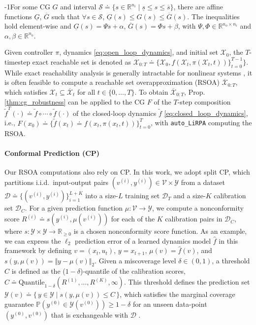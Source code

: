 \documentclass{l4dc2026}
\begin{document}
\begin{proposition}
\label{thm:cg_robustness}
\looseness-1For some CG $G$ and interval $\mathcal{S} \doteq \{s \in \mathbb{R}^{n_i} \mid \underline{s} \le s \le \overline{s}\}$, there are affine functions $\underline{G}$, $\overline{G}$ such that $\forall s \in \mathcal{S}$, $\underline{G}(s) \leq G(s) \leq \overline{G}(s)$. 
The inequalities hold element-wise and $\underline{G}(s) = \Psi s + \alpha$,  $\overline{G}(s) = \Phi s + \beta$, with $\Psi, \Phi \in \mathbb{R}^{n_o \times n_i}$ and $\alpha, \beta \in \mathbb{R}^{n_o}$.
\end{proposition}

\noindent Given controller $\pi$, dynamics \eqref{eq:open_loop_dynamics}, and initial set $\mathcal{X}_0$, the $T$-timestep exact reachable set is denoted as $\mathcal{X}_{0:T} \doteq \{\mathcal{X}_0, f(\mathcal{X}_t, \pi(\mathcal{X}_t,t)) \}_{t=0}^{T-1}\}$. While exact reachability analysis is generally intractable for nonlinear systems \citep{DBLP:journals/arcras/AlthoffFG21}, it is often feasible to compute a reachable set overapproximation (RSOA) $\overline{\mathcal{X}}_{0:T}$, which satisfies $\mathcal{X}_t \subseteq \overline{\mathcal{X}}_t$ for all $t \in \{0,\ldots,T\}$. To obtain $\overline{\mathcal{X}}_{0:T}$, Prop. \ref{thm:cg_robustness} can be applied to the CG $F$ of the $T$-step composition ${\tilde f^{T}}(\cdot) \doteq \tilde{f} \circ \dotsb \circ \tilde{f}(\cdot)$ of the closed-loop dynamics $\tilde f$ \eqref{eq:closed_loop_dynamics}, i.e., $F(x_0) \doteq \{\tilde f(x_t) \doteq f(x_t, \pi(x_t, t)) \}_{t=0}^{T}$, with \texttt{auto\_LiRPA} computing the RSOA.

\paragraph{Conformal Prediction (CP)}
Our RSOA computations also rely on CP. In this work, we adopt split CP, which partitions i.i.d.\ input-output pairs $(v^{(i)}, y^{(i)}) \in \mathcal{V}\times\mathcal{Y}$ from a dataset $\mathcal{D} \doteq\{(v^{(i)}, y^{(i)})\}_{i=1}^{L+K}$ into a size-$L$ training set $\mathcal{D}_T$ and a size-$K$ calibration set $\mathcal{D}_C$. For a given prediction function $\mu:\mathcal{V}\!\to\!\mathcal{Y}$, we compute a nonconformity score $R^{(i)}\!\doteq s(y^{(i)},\mu(v^{(i)}))$ for each of the $K$ calibration pairs in $\mathcal{D}_C$, where $s: \mathcal{Y}\times \mathcal{Y} \rightarrow \mathbb{R}_{\ge 0}$ is a chosen nonconformity score function. As an example, we can express the $\ell_2$ prediction error of a learned dynamics model $\hat f$ in this framework by defining $v = (x_t, u_t)$, $y = x_{t+1}$, $\mu(v) = \hat f(v)$, and $s(y, \mu(v)) = \Vert y - \mu(v)\Vert_2$. Given a miscoverage level $\delta\in(0,1)$, a threshold $C$ is defined as the ($1-\delta$)-quantile of the calibration scores, $C \doteq \text{Quantile}_{1-\delta}(R^{(1)},\dots,R^{(K)},\infty)$. This threshold defines the prediction set $\mathcal{Y}(v) \doteq \{\,y\in\mathcal{Y} \mid s(y,\mu(v))\le C \,\}$, which satisfies the marginal coverage guarantee $\mathbb{P}(y^{(0)}\in\mathcal{Y}(v^{(0)})) \ge 1-\delta$ for an unseen data-point $(y^{(0)}, v^{(0)})$ that is exchangeable with $\mathcal{D}$ \citep{cp_survey}. 
\end{document}
